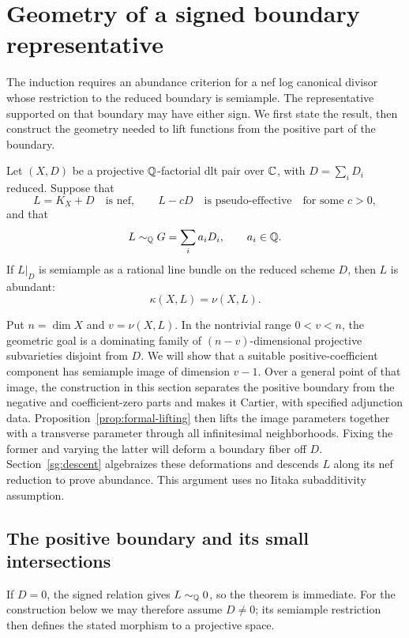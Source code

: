 \section{Geometry of a signed boundary representative}
\label{sg:section}

The induction requires an abundance criterion for a nef log canonical
divisor whose restriction to the reduced boundary is semiample.
The representative supported on that boundary may have either sign.
We first state the result, then construct the geometry needed to lift
functions from the positive part of the boundary.

\begin{theorem}\label{thm:signed}
Let $(X,D)$ be a projective $\mathbb{Q}$-factorial dlt pair over $\mathbb{C}$, with
$D=\sum_iD_i$ reduced.  Suppose that
\[
 L=K_X+D\quad\text{is nef},\qquad L-cD\quad\text{is pseudo-effective}
 \quad\text{for some }c>0,
\]
and that
\[
 L\sim_{\mathbb{Q}}G=\sum_i a_iD_i,\qquad a_i\in\mathbb{Q}.
\]
If $L|_D$ is semiample as a rational line bundle on the reduced scheme
$D$, then $L$ is abundant:
\[
 \kappa(X,L)=\nu(X,L).
\]
\end{theorem}

Put $n=\dim X$ and $v=\nu(X,L)$. In the nontrivial range $0<v<n$,
the geometric goal is a dominating family of $(n-v)$-dimensional
projective subvarieties disjoint from $D$. We will show that a suitable
positive-coefficient component has semiample image of dimension $v-1$.
Over a general point of that image, the construction in this section
separates the positive boundary from the negative and coefficient-zero
parts and makes it Cartier, with specified adjunction data.
Proposition~\ref{prop:formal-lifting} then lifts the image parameters
together with a transverse parameter through all infinitesimal
neighborhoods. Fixing the former and varying the latter will deform a
boundary fiber off $D$. Section~\ref{sg:descent} algebraizes these
deformations and descends $L$ along its nef reduction to prove abundance.
This argument uses no Iitaka subadditivity assumption.

\subsection{The positive boundary and its small intersections}

If $D=0$, the signed relation gives $L\sim_{\mathbb{Q}}0$, so the theorem
is immediate.  For the construction below we may therefore assume
$D\ne0$; its semiample restriction then defines the stated morphism
to a projective space.


